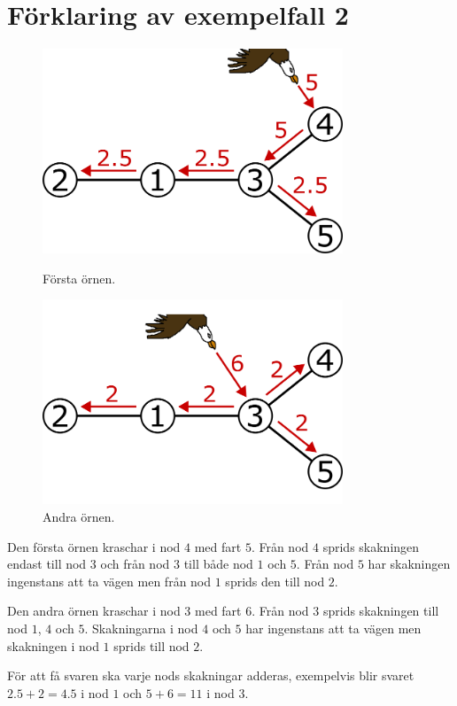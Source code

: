 \section*{Förklaring av exempelfall 2}
\begin{figure}
  \centering
  \begin{minipage}{.5\textwidth}
    \centering
    \includegraphics[width=0.8\textwidth]{a}
    \caption{Första örnen.}
    \label{fig:test1}
  \end{minipage}%
  \begin{minipage}{.5\textwidth}
    \centering
    \includegraphics[width=0.8\textwidth]{b}
    \caption{Andra örnen.}
    \label{fig:test2}
  \end{minipage}
\end{figure}
      
      
Den första örnen kraschar i nod $4$ med fart $5$.
Från nod $4$ sprids skakningen endast till nod $3$ och från nod $3$ till både nod $1$ och $5$.
Från nod $5$ har skakningen ingenstans att ta vägen men från nod $1$ sprids den till nod $2$.

Den andra örnen kraschar i nod $3$ med fart $6$.
Från nod $3$ sprids skakningen till nod $1$, $4$ och $5$.
Skakningarna i nod $4$ och $5$ har ingenstans att ta vägen men skakningen i nod $1$ sprids till nod $2$.

För att få svaren ska varje nods skakningar adderas, exempelvis blir svaret $2.5+2=4.5$ i nod $1$ och $5+6=11$ i nod $3$.
